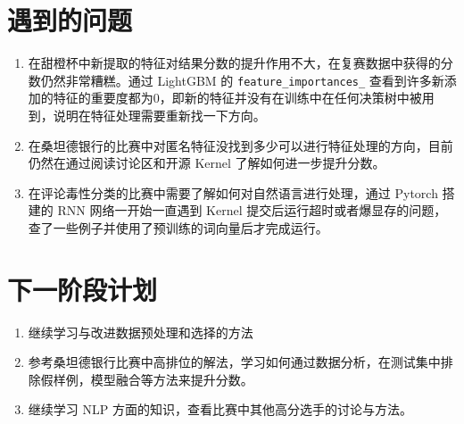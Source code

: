 \documentclass[12pt]{article}
\begin{document}
\section{遇到的问题}
\begin{enumerate}
    \item 在甜橙杯中新提取的特征对结果分数的提升作用不大，在复赛数据中获得的分数仍然非常糟糕。通过 LightGBM 的 \lstinline{feature_importances_} 查看到许多新添加的特征的重要度都为0，即新的特征并没有在训练中在任何决策树中被用到，说明在特征处理需要重新找一下方向。
    \item 在桑坦德银行的比赛中对匿名特征没找到多少可以进行特征处理的方向，目前仍然在通过阅读讨论区和开源 Kernel 了解如何进一步提升分数。
    \item 在评论毒性分类的比赛中需要了解如何对自然语言进行处理，通过 Pytorch 搭建的 RNN 网络一开始一直遇到 Kernel 提交后运行超时或者爆显存的问题，查了一些例子并使用了预训练的词向量后才完成运行。
\end{enumerate}


\section{下一阶段计划}

\begin{enumerate}
    \item 继续学习与改进数据预处理和选择的方法
    \item 参考桑坦德银行比赛中高排位的解法，学习如何通过数据分析，在测试集中排除假样例，模型融合等方法来提升分数。
    \item 继续学习 NLP 方面的知识，查看比赛中其他高分选手的讨论与方法。
\end{enumerate}
\end{document}
